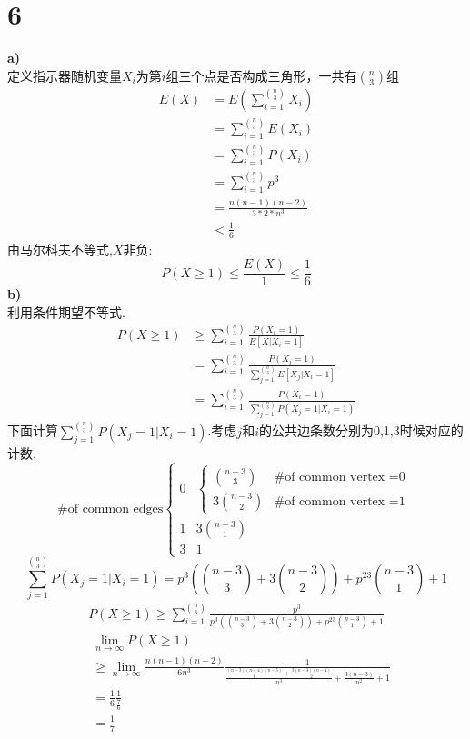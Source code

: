 \documentclass[a4paper,twocolumn]{ctexart}
\begin{document}
\section*{6}
\noindent \textbf{a)}\\
定义指示器随机变量$X_i$为第$i$组三个点是否构成三角形，一共有$\binom{n}{3}$组
\begin{align*}
E(X)&=E(\sum_{i=1}^{\binom{n}{3}}X_i)\\
&=\sum_{i=1}^{\binom{n}{3}}E(X_i)\\
&=\sum_{i=1}^{\binom{n}{3}}P(X_i)\\
&=\sum_{i=1}^{\binom{n}{3}}p^3\\
&=\frac{n(n-1)(n-2)}{3*2*n^3}\\
&<\frac{1}{6}
\end{align*}
由马尔科夫不等式,$X$非负:
\[
P(X\ge 1)\le \frac{E(X)}{1}\le \frac{1}{6}
\]
\noindent \textbf{b)}\\
利用条件期望不等式.
\begin{align*}
P(X\ge 1)&\ge \sum_{i=1}^{\binom{n}{3}}\frac{P(X_i=1)}{E[X|X_i=1]}\\
&=\sum_{i=1}^{\binom{n}{3}}\frac{P(X_i=1)}{\sum_{j=1}^{\binom{n}{3}}E[X_j|X_i=1]}\\
&=\sum_{i=1}^{\binom{n}{3}}\frac{P(X_i=1)}{\sum_{j=1}^{\binom{n}{3}}P(X_j=1|X_i=1)}
\end{align*}
下面计算$\sum_{j=1}^{\binom{n}{3}}P(X_j=1|X_i=1)$.考虑$j$和$i$的公共边条数分别为0,1,3时候对应的计数.
\[
\text{\# of common edges}
\begin{cases}
0& \begin{cases}
\binom{n-3}{3}  &\text{\# of common vertex =0}\\
3\binom{n-3}{2} &\text{\# of common vertex =1}
\end{cases}\\
1& 3\binom{n-3}{1}\\
3& 1
\end{cases}
\]
\[
\sum_{j=1}^{\binom{n}{3}}P(X_j=1|X_i=1)=p^3\left(\binom{n-3}{3}+3\binom{n-3}{2}\right)+p^23\binom{n-3}{1}+1
\]
\begin{align*}
P(X\ge 1)\ge \sum_{i=1}^{\binom{n}{3}} \frac{p^3}{p^3\left(\binom{n-3}{3}+3\binom{n-3}{2}\right)+p^23\binom{n-3}{1}+1}
\end{align*}
\begin{align*}
&\lim_{n \to \infty}P(X\ge 1)\\
&\ge \lim_{n \to \infty} \frac{n(n-1)(n-2)}{6n^3}
\frac{1}
{
\frac{\frac{(n-3)(n-4)(n-5)}{6}
+\frac{3(n-3)(n-4)}{2}
}{n^3}
+\frac{3(n-3)}{n^2}
+1}\\
&=\frac{1}{6}\frac{1}{\frac{7}{6}}\\
&=\frac{1}{7}
\end{align*}
\end{document}
